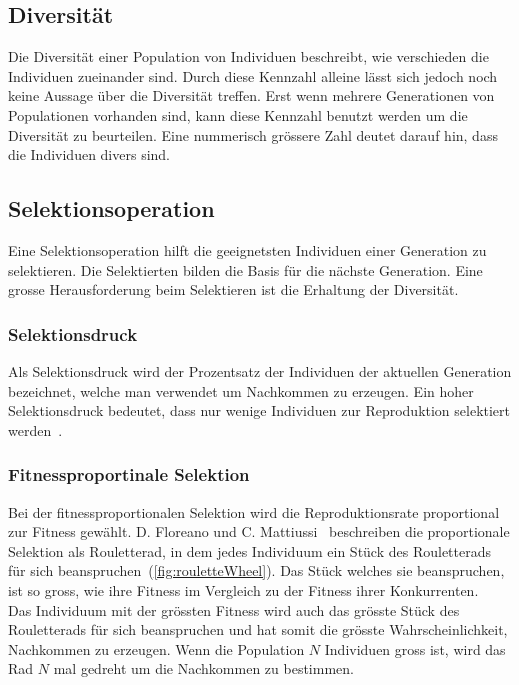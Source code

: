     \subsection{Diversität\label{sub:diversity}}

      Die Diversität einer Population von Individuen beschreibt, wie verschieden die Individuen zueinander sind.
      Durch diese Kennzahl alleine lässt sich jedoch noch keine Aussage über die Diversität treffen.
      Erst wenn mehrere Generationen von Populationen vorhanden sind,
      kann diese Kennzahl benutzt werden um die Diversität zu beurteilen.
      Eine nummerisch grössere Zahl deutet darauf hin, dass die Individuen divers sind.

    \subsection{Selektionsoperation}

      Eine Selektionsoperation hilft die geeignetsten Individuen einer Generation zu selektieren.
      Die Selektierten bilden die Basis für die nächste Generation.
      Eine grosse Herausforderung beim Selektieren ist die Erhaltung der Diversität.

      \subsubsection{Selektionsdruck\label{subsub:SelectionPressure}}

        Als Selektionsdruck wird der Prozentsatz der Individuen der aktuellen Generation bezeichnet,
        welche man verwendet um Nachkommen zu erzeugen.
        Ein hoher Selektionsdruck bedeutet,
        dass nur wenige Individuen zur Reproduktion selektiert werden~\cite[S.23]{book:bioInspired}.

      \subsubsection{Fitnessproportinale Selektion}

        Bei der fitnessproportionalen Selektion wird die Reproduktionsrate proportional zur Fitness gewählt.
        D. Floreano und C. Mattiussi~\cite[S.23]{book:bioInspired} beschreiben die proportionale Selektion als Rouletterad,
        in dem jedes Individuum ein Stück des Rouletterads für sich beanspruchen~(\vref{fig:rouletteWheel}).
        Das Stück welches sie beanspruchen, ist so gross,
        wie ihre Fitness im Vergleich zu der Fitness ihrer Konkurrenten.
        \\
        Das Individuum mit der grössten Fitness wird auch das grösste Stück des Rouletterads für sich beanspruchen und hat somit die grösste Wahrscheinlichkeit, Nachkommen zu erzeugen.
        Wenn die Population \(N\) Individuen gross ist, wird das Rad \(N\) mal gedreht um die Nachkommen zu bestimmen.


